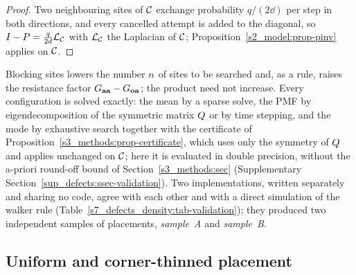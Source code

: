 \begin{proof}
Two neighbouring sites of $\mathcal{C}$ exchange probability $q/(2\dd)$ per step in both directions, and every cancelled
attempt is added to the diagonal, so $I-P=\frac{q}{2d}\mathcal{L}_{\mathcal{C}}$ with $\mathcal{L}_{\mathcal{C}}$ the Laplacian of $\mathcal{C}$;
Proposition~\ref{s2_model:prop-pinv} applies on $\mathcal{C}$.
\end{proof}

Blocking sites lowers the number $n$ of sites to be searched and, as a rule, raises the resistance factor
$G_{\mathbf{a}\mathbf{a}}-G_{\mathbf{o}\mathbf{a}}$; the product need not increase. Every configuration is solved exactly: the mean by a
sparse solve, the PMF by eigendecomposition of the symmetric matrix $Q$ or by time stepping, and the mode by exhaustive
search together with the certificate of Proposition~\ref{s3_methods:prop-certificate}, which uses only the symmetry of
$Q$ and applies unchanged on $\mathcal{C}$; here it is evaluated in double precision, without the a-priori round-off bound
of Section~\ref{s3_methods:sec} (Supplementary Section~\ref{sup_defects:ssec-validation}). Two implementations, written separately and sharing no code, agree with each
other and with a direct simulation of the walker rule (Table~\ref{s7_defects_density:tab-validation}); they produced two
independent samples of placements, \emph{sample~A} and \emph{sample~B}.

\subsection{Uniform and corner-thinned placement}\label{s7_defects_density:ssec-sweep}

